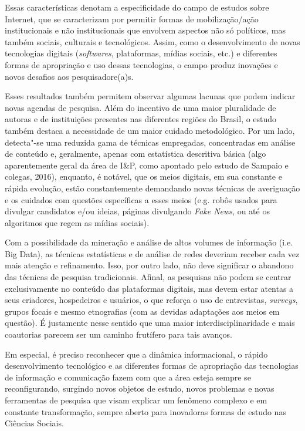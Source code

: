 Essas características denotam a especificidade do campo de estudos sobre
Internet, que se caracterizam por permitir formas de mobilização/ação
institucionais e não institucionais que envolvem aspectos não só
políticos, mas também sociais, culturais e tecnológicos. Assim, como o
desenvolvimento de novas tecnologias digitais (\emph{\emph{\emph{\emph{software}}s}},
plataformas, mídias sociais, etc.) e diferentes formas de apropriação e
uso dessas tecnologias, o campo produz inovações e novos desafios aos
pesquisadore(a)s.

Esses resultados também permitem observar algumas lacunas que podem
indicar novas agendas de pesquisa. Além do incentivo de uma maior
pluralidade de autoras e de instituições presentes nas diferentes
regiões do Brasil, o estudo também destaca a necessidade de um maior
cuidado metodológico. Por um lado, detecta"-se uma reduzida gama de
técnicas empregadas, concentradas em análise de conteúdo e, geralmente,
apenas com estatística descritiva básica (algo aparentemente geral da
área de I\&P, como apontado pelo estudo de Sampaio e colegas, 2016),
enquanto, é notável, que os meios digitais, em sua constante e rápida
evolução, estão constantemente demandando novas técnicas de averiguação
e os cuidados com questões específicas a esses meios (e.g. robôs usados
para divulgar candidatos e/ou ideias, páginas divulgando \emph{Fake
News}, ou até os algoritmos que regem as mídias sociais).

Com a possibilidade da mineração e análise de altos volumes de
informação (i.e. Big Data), as técnicas estatísticas e de análise de
redes deveriam receber cada vez mais atenção e refinamento. Isso, por
outro lado, não deve significar o abandono das técnicas de pesquisa
tradicionais. Afinal, as pesquisas não podem se centrar exclusivamente
no conteúdo das plataformas digitais, mas devem estar atentas a seus
criadores, hospedeiros e usuários, o que reforça o uso de entrevistas,
\emph{surveys}, grupos focais e mesmo etnografias (com as devidas
adaptações aos meios em questão). É justamente nesse sentido que uma
maior interdisciplinaridade e mais coautorias parecem ser um caminho
frutífero para tais avanços.

Em especial, é preciso reconhecer que a dinâmica informacional, o rápido
desenvolvimento tecnológico e as diferentes formas de apropriação das
tecnologias de informação e comunicação fazem com que a área esteja
sempre se reconfigurando, surgindo novos objetos de estudo, novos
problemas e novas ferramentas de pesquisa que visam explicar um fenômeno
complexo e em constante transformação, sempre aberto para inovadoras
formas de estudo nas Ciências Sociais.

